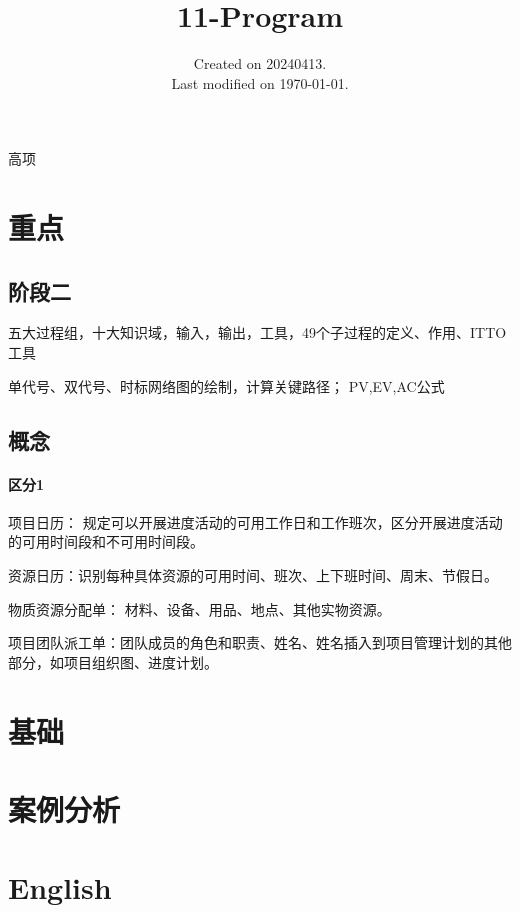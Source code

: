 \documentclass[UTF8]{../computerUniverse}
\begin{document}
\title{11-Program}
\date{Created on 20240413.\\   Last modified on \today.}
\maketitle
\tableofcontents


高项


\chapter{重点}


\section{阶段二}
五大过程组，十大知识域，输入，输出，工具，49个子过程的定义、作用、ITTO工具

单代号、双代号、时标网络图的绘制，计算关键路径；
PV,EV,AC公式


\section{概念}
\subsubsection{区分1}

项目日历： 规定可以开展进度活动的可用工作日和工作班次，区分开展进度活动的可用时间段和不可用时间段。

资源日历：识别每种具体资源的可用时间、班次、上下班时间、周末、节假日。

物质资源分配单： 材料、设备、用品、地点、其他实物资源。

项目团队派工单：团队成员的角色和职责、姓名、姓名插入到项目管理计划的其他部分，如项目组织图、进度计划。




\chapter{基础}

\chapter{案例分析}

\chapter{English}
\end{document}
